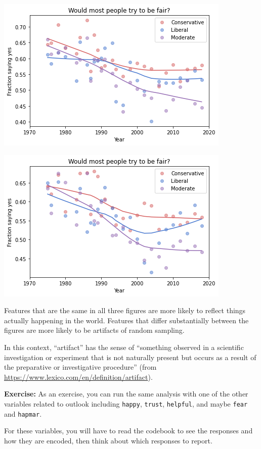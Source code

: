 \begin{center}
\includegraphics[scale=0.75]{chapters/03_outlook_files/03_outlook_60_1.png}
\end{center}

\begin{center}
\includegraphics[scale=0.75]{chapters/03_outlook_files/03_outlook_60_2.png}
\end{center}

Features that are the same in all three figures are more likely to
reflect things actually happening in the world. Features that differ
substantially between the figures are more likely to be artifacts of
random sampling.

In this context, ``artifact'' has the sense of ``something observed in a
scientific investigation or experiment that is not naturally present but
occurs as a result of the preparative or investigative procedure'' (from
\url{https://www.lexico.com/en/definition/artifact}).

\textbf{Exercise:} As an exercise, you can run the same analysis with
one of the other variables related to outlook including
\passthrough{\lstinline!happy!}, \passthrough{\lstinline!trust!},
\passthrough{\lstinline!helpful!}, and maybe
\passthrough{\lstinline!fear!} and \passthrough{\lstinline!hapmar!}.

For these variables, you will have to read the codebook to see the
responses and how they are encoded, then think about which responses to
report.

